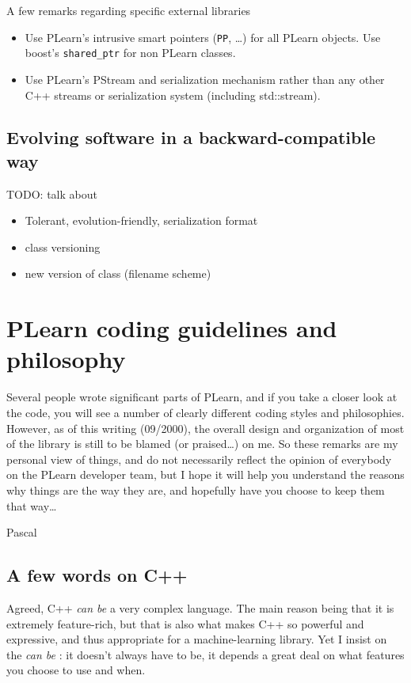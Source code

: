 \documentclass[11pt]{book}
\begin{document}
A few remarks regarding specific external libraries
\begin{itemize}
\item Use PLearn's intrusive smart pointers ({\tt PP}, \ldots) for all
  PLearn objects. Use boost's \verb!shared_ptr! for non PLearn classes. 
\item Use PLearn's PStream and serialization mechanism rather than any
  other C++ streams or serialization system  (including std::stream).
\end{itemize}

\section{Evolving software in a backward-compatible way}

TODO: talk about 
\begin{itemize}
\item Tolerant, evolution-friendly, serialization format
\item class versioning
\item new version of class (filename scheme)
\end{itemize}



\chapter{ PLearn coding guidelines and philosophy}

 Several people wrote significant parts of PLearn, and if you take a
closer look at the code, you will see a number of clearly different
coding styles and philosophies. However, as of this writing (09/2000),
the overall design and organization of most of the library is still to
be blamed (or praised\ldots) on me. So these remarks are my personal
view of things, and do not necessarily reflect the opinion of everybody
on the PLearn developer team, but I hope it will help you understand
the reasons why things are the way they are, and hopefully have you
choose to keep them that way\ldots

 Pascal 

\section{A few words on C++}
 Agreed, C++ \emph{can be} a very complex language. The main reason
being that it is extremely feature-rich, but that is also what
makes C++ so powerful and expressive, and thus appropriate for a
machine-learning library. Yet I insist on the \emph{can be} : it
doesn't always have to be, it depends a great deal on what features
you choose to use and when.
\end{document}
